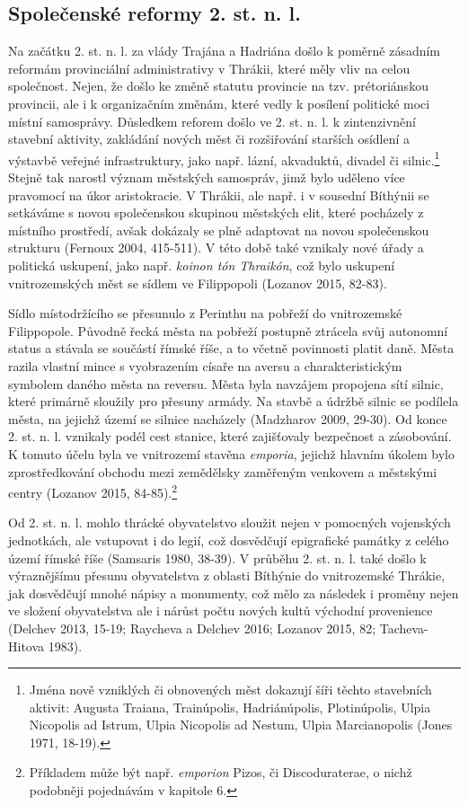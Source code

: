 \subsection[společenské-reformy-2.-st.-n.-l.]{Společenské reformy 2. st. n. l.}

Na začátku 2. st. n. l. za vlády Trajána a Hadriána došlo k poměrně zásadním reformám provinciální administrativy v Thrákii, které měly vliv na celou společnost. Nejen, že došlo ke změně statutu provincie na tzv. prétoriánskou provincii, ale i k organizačním změnám, které vedly k posílení politické moci místní samosprávy. Důsledkem reforem došlo ve 2. st. n. l. k zintenzivnění stavební aktivity, zakládání nových měst či rozšiřování starších osídlení a výstavbě veřejné infrastruktury, jako např. lázní, akvaduktů, divadel či silnic.\footnote{Jména nově vzniklých či obnovených měst dokazují šíři těchto stavebních aktivit: Augusta Traiana, Trainúpolis, Hadriánúpolis, Plotinúpolis, Ulpia Nicopolis ad Istrum, Ulpia Nicopolis ad Nestum, Ulpia Marcianopolis (Jones 1971, 18-19).} Stejně tak narostl význam městských samospráv, jimž bylo uděleno více pravomocí na úkor aristokracie. V Thrákii, ale např. i v sousední Bíthýnii se setkáváme s novou společenskou skupinou městských elit, které pocházely z místního prostředí, avšak dokázaly se plně adaptovat na novou společenskou strukturu (Fernoux 2004, 415-511). V této době také vznikaly nové úřady a politická uskupení, jako např. {\em koinon tón Thraikón}, což bylo uskupení vnitrozemských měst se sídlem ve Filippopoli (Lozanov 2015, 82-83).

Sídlo místodržícího se přesunulo z Perinthu na pobřeží do vnitrozemské Filippopole. Původně řecká města na pobřeží postupně ztrácela svůj autonomní status a stávala se součástí římské říše, a to včetně povinnosti platit daně. Města razila vlastní mince s vyobrazením císaře na aversu a charakteristickým symbolem daného města na reversu. Města byla navzájem propojena sítí silnic, které primárně sloužily pro přesuny armády. Na stavbě a údržbě silnic se podílela města, na jejichž území se silnice nacházely (Madzharov 2009, 29-30). Od konce 2. st. n. l. vznikaly podél cest stanice, které zajišťovaly bezpečnost a zásobování. K tomuto účelu byla ve vnitrozemí stavěna {\em emporia}, jejichž hlavním úkolem bylo zprostředkování obchodu mezi zemědělsky zaměřeným venkovem a městskými centry (Lozanov 2015, 84-85).\footnote{Příkladem může být např. {\em emporion} Pizos, či Discoduraterae, o nichž podobněji pojednávám v kapitole 6.}

Od 2. st. n. l. mohlo thrácké obyvatelstvo sloužit nejen v pomocných vojenských jednotkách, ale vstupovat i do legií, což dosvědčují epigrafické památky z celého území římské říše (Samsaris 1980, 38-39). V průběhu 2. st. n. l. také došlo k výraznějšímu přesunu obyvatelstva z oblasti Bíthýnie do vnitrozemské Thrákie, jak dosvědčují mnohé nápisy a monumenty, což mělo za následek i proměny nejen ve složení obyvatelstva ale i nárůst počtu nových kultů východní provenience (Delchev 2013, 15-19; Raycheva a Delchev 2016; Lozanov 2015, 82; Tacheva-Hitova 1983).

